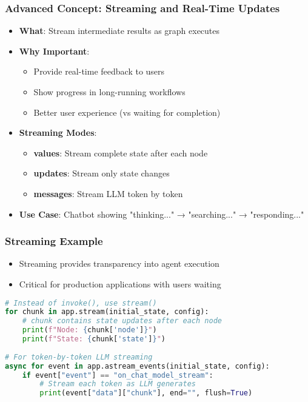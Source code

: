 \begin{frame}[fragile]\frametitle{Advanced Concept: Streaming and Real-Time Updates}
      \begin{itemize}
        \item \textbf{What}: Stream intermediate results as graph executes
        \item \textbf{Why Important}:
        \begin{itemize}
            \item Provide real-time feedback to users
            \item Show progress in long-running workflows
            \item Better user experience (vs waiting for completion)
        \end{itemize}
        \item \textbf{Streaming Modes}:
        \begin{itemize}
            \item \textbf{values}: Stream complete state after each node
            \item \textbf{updates}: Stream only state changes
            \item \textbf{messages}: Stream LLM token by token
        \end{itemize}
        \item \textbf{Use Case}: Chatbot showing "thinking..." → "searching..." → "responding..."
      \end{itemize}
\end{frame}

\begin{frame}[fragile]\frametitle{Streaming Example}

      \begin{itemize}
        \item Streaming provides transparency into agent execution
        \item Critical for production applications with users waiting
      \end{itemize}
	  
      \begin{lstlisting}[language=Python, basicstyle=\tiny]
# Instead of invoke(), use stream()
for chunk in app.stream(initial_state, config):
    # chunk contains state updates after each node
    print(f"Node: {chunk['node']}")
    print(f"State: {chunk['state']}")
    
# For token-by-token LLM streaming
async for event in app.astream_events(initial_state, config):
    if event["event"] == "on_chat_model_stream":
        # Stream each token as LLM generates
        print(event["data"]["chunk"], end="", flush=True)
      \end{lstlisting}
      

\end{frame}

